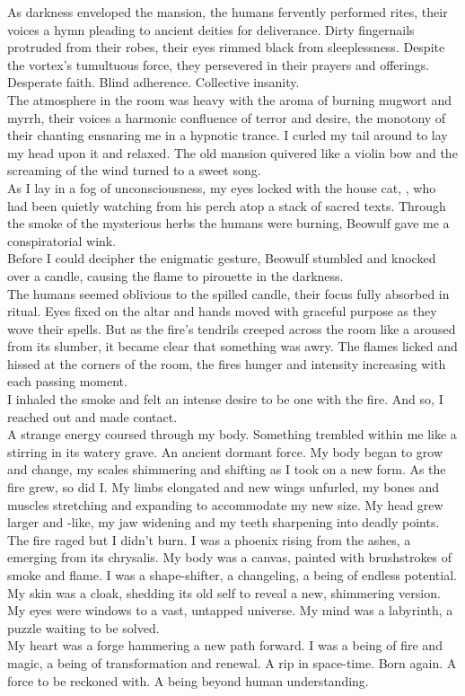 As darkness enveloped the mansion, the humans fervently performed rites, their voices a hymn pleading to ancient deities for deliverance. Dirty fingernails protruded from their robes, their eyes rimmed black from sleeplessness. Despite the vortex's tumultuous force, they persevered in their prayers and offerings. Desperate faith. Blind adherence. Collective insanity. \\
The atmosphere in the room was heavy with the aroma of burning mugwort and myrrh, their voices a harmonic confluence of terror and desire, the monotony of their chanting ensnaring me in a hypnotic trance. I curled my tail around to lay my head upon it and relaxed. The old mansion quivered like a violin bow and the screaming of the wind turned to a sweet song. \\

As I lay in a fog of unconsciousness, my eyes locked with the house cat, , who had been quietly watching from his perch atop a stack of sacred texts. Through the smoke of the mysterious herbs the humans were burning, Beowulf gave me a conspiratorial wink. \\
Before I could decipher the enigmatic gesture, Beowulf stumbled and knocked over a candle, causing the flame to pirouette in the darkness. \\
The humans seemed oblivious to the spilled candle, their focus fully absorbed in ritual. Eyes fixed on the altar and hands moved with graceful purpose as they wove their spells. But as the fire's tendrils creeped across the room like a  aroused from its slumber, it became clear that something was awry. The flames licked and hissed at the corners of the room, the fires hunger and intensity increasing with each passing moment. \\

I inhaled the smoke and felt an intense desire to be one with the fire. And so, I reached out and made contact. \\
A strange energy coursed through my body. Something trembled within me like a  stirring in its watery grave. An ancient dormant force. My body began to grow and change, my scales shimmering and shifting as I took on a new form. As the fire grew, so did I. My limbs elongated and new wings unfurled, my bones and muscles stretching and expanding to accommodate my new size. My head grew larger and -like, my jaw widening and my teeth sharpening into deadly points. \\
The fire raged but I didn't burn. I was a phoenix rising from the ashes, a  emerging from its chrysalis. My body was a canvas, painted with brushstrokes of smoke and flame. I was a shape-shifter, a changeling, a being of endless potential. My skin was a cloak, shedding its old self to reveal a new, shimmering version. My eyes were windows to a vast, untapped universe. My mind was a labyrinth, a puzzle waiting to be solved. \\
My heart was a forge hammering a new path forward. I was a being of fire and magic, a being of transformation and renewal. A rip in space-time. Born again. A force to be reckoned with. A being beyond human understanding. \\

